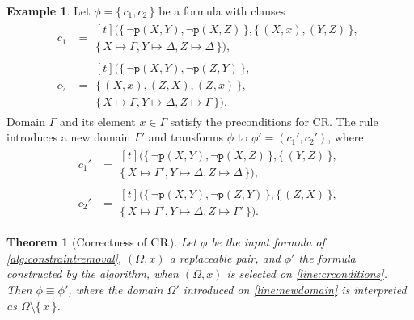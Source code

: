 \documentclass{article}
\newtheorem{theorem}{Theorem}
\theoremstyle{definition}
\newtheorem{example}{Example}
\theoremstyle{remark}
\DeclareMathOperator{\CR}{\textsc{CR}}
\begin{document}
\begin{example}
  Let $\phi = \{\, c_1, c_2 \,\}$ be a formula with clauses
  \begin{align*}
    c_1 &=
          \begin{multlined}[t]
            (\{\, \neg \texttt{p}(X, Y), \neg \texttt{p}(X, Z) \,\}, \{\, (X, x), (Y, Z) \,\}, \\
            \{\, X \mapsto \Gamma, Y \mapsto \Delta, Z \mapsto \Delta \,\}),
          \end{multlined}\\
    c_2 &=
          \begin{multlined}[t]
            (\{\, \neg \texttt{p}(X, Y), \neg \texttt{p}(Z, Y) \,\}, \\
            \{\, (X, x), (Z, X), (Z, x) \,\}, \\
            \{\, X \mapsto \Gamma, Y \mapsto \Delta, Z \mapsto \Gamma \,\}).
          \end{multlined}
  \end{align*}
  Domain $\Gamma$ and its element $x \in \Gamma$ satisfy the preconditions for
  CR\@. The rule introduces a new domain $\Gamma'$ and transforms $\phi$ to
  $\phi' = (c_1', c_2')$, where
  \begin{align*}
    c_1' &=
           \begin{multlined}[t]
             (\{\, \neg \texttt{p}(X, Y), \neg \texttt{p}(X, Z) \,\}, \{\, (Y, Z) \,\}, \\
             \{\, X \mapsto \Gamma', Y \mapsto \Delta, Z \mapsto \Delta \,\}),
           \end{multlined} \\
    c_2' &=
           \begin{multlined}[t]
             (\{\, \neg \texttt{p}(X, Y), \neg \texttt{p}(Z, Y) \,\}, \{\, (Z, X) \,\}, \\
             \{\, X \mapsto \Gamma', Y \mapsto \Delta, Z \mapsto \Gamma' \,\}).
           \end{multlined}
  \end{align*}
\end{example}

\begin{theorem}[Correctness of $\CR$]
  Let $\phi$ be the input formula of \cref{alg:constraintremoval}, $(\Omega, x)$
  a replaceable pair, and $\phi'$ the formula constructed by the algorithm, when
  $(\Omega, x)$ is selected on \cref{line:crconditions}. Then
  $\phi \equiv \phi'$, where the domain $\Omega'$ introduced on
  \cref{line:newdomain} is interpreted as $\Omega \setminus \{\, x \,\}$.
\end{theorem}
\end{document}
